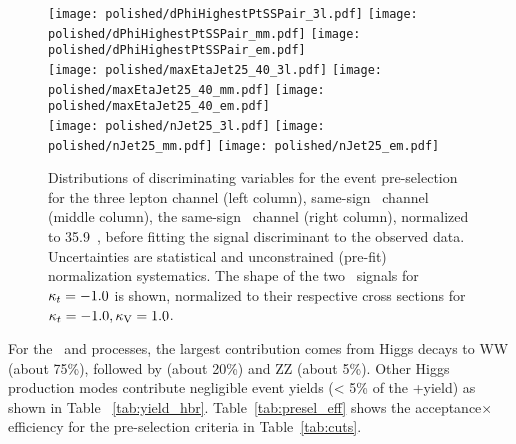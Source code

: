 \begin{figure}[!htb]
\centering
        \texttt{[image: polished/dPhiHighestPtSSPair\_3l.pdf]}
        \texttt{[image: polished/dPhiHighestPtSSPair\_mm.pdf]}              
        \texttt{[image: polished/dPhiHighestPtSSPair\_em.pdf]}\\
        \texttt{[image: polished/maxEtaJet25\_40\_3l.pdf]}
        \texttt{[image: polished/maxEtaJet25\_40\_mm.pdf]}
        \texttt{[image: polished/maxEtaJet25\_40\_em.pdf]}\\  
        \texttt{[image: polished/nJet25\_3l.pdf]}                    
        \texttt{[image: polished/nJet25\_mm.pdf]} 
        \texttt{[image: polished/nJet25\_em.pdf]} 
\caption[Discriminating variables for the event pre-selection.]{Distributions of discriminating variables for the event pre-selection for the three lepton channel (left column), same-sign \mumu\ channel (middle column), the same-sign \emu\ channel (right column), normalized to 35.9\ \fbinv, before fitting the signal discriminant to the observed data. Uncertainties are statistical and unconstrained (pre-fit) normalization systematics. The shape of the two \tH\ signals for $\kappa_t=-1.0$ is shown, normalized to their respective cross sections for $\kappa_t=-1.0, \kappa_\text{V}=1.0$.}
\label{fig:input_vars_presel}
\end{figure}

For the \tH\ and \ttH processes, the largest contribution comes from Higgs decays to WW (about 75\%), followed by \tautau (about 20\%) and ZZ (about 5\%). Other Higgs production modes contribute negligible event yields (< 5\% of the \tH +\ttH yield) as shown in Table ~\ref{tab:yield_hbr}. Table~\ref{tab:presel_eff} shows the acceptance$\times$efficiency for the pre-selection criteria in Table~\ref{tab:cuts}.   

